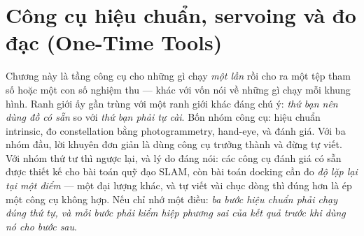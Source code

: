 \documentclass[../../marker.tex]{subfiles}
\begin{document}
\chapter{Công cụ hiệu chuẩn, servoing và đo đạc (One-Time Tools)}

\begin{tomtat}
Chương này là tầng công cụ cho những gì chạy \emph{một lần} rồi cho ra một tệp tham số hoặc một con số nghiệm thu --- khác với  vốn nói về những gì chạy mỗi khung hình. Ranh giới ấy gần trùng với một ranh giới khác đáng chú ý: \emph{thứ bạn nên dùng đồ có sẵn} so với \emph{thứ bạn phải tự cài}. Bốn nhóm công cụ: hiệu chuẩn intrinsic, đo constellation bằng photogrammetry, hand-eye, và đánh giá. Với ba nhóm đầu, lời khuyên đơn giản là dùng công cụ trưởng thành và đừng tự viết. Với nhóm thứ tư thì ngược lại, và lý do đáng nói: các công cụ đánh giá có sẵn được thiết kế cho bài toán quỹ đạo SLAM, còn bài toán docking cần đo \emph{độ lặp lại tại một điểm} --- một đại lượng khác, và tự viết vài chục dòng thì đúng hơn là ép một công cụ không hợp. Nếu chỉ nhớ một điều: \emph{ba bước hiệu chuẩn phải chạy đúng thứ tự, và mỗi bước phải kiểm hiệp phương sai của kết quả trước khi dùng nó cho bước sau}.
\end{tomtat}

\begin{nentang}
\end{nentang}
\end{document}
